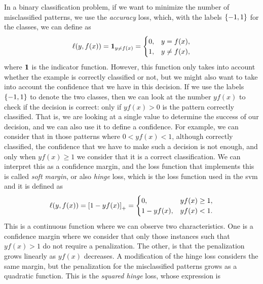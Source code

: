 In a binary classification problem, if we want to minimize the number of misclassified patterns, we use the \emph{accuracy} loss, which, with the labels $\left\{-1, 1\right\}$ for the classes, we can define as
\begin{equation}
    \label{eq:acc_def}
    \lossf(y, f(x)) = \ind_{y \neq f(x)} = 
    \begin{cases}
        0, & y = f(x) ,\\
        1, & y \neq f(x) ,
    \end{cases}
\end{equation}
where $\bm{1}$ is the indicator function.
% 
However, this function only takes into account whether the example is correctly classified or not, but we might also want to take into account the confidence that we have in this decision. If we use the labels $\left\{-1, 1\right\}$ to denote the two classes, then we can look at the number $y f(x)$ to check if the decision is correct: only if $y f(x) > 0$ is the pattern correctly classified. That is, we are looking at a single value to determine the success of our decision, and we can also use it to define a confidence. For example, we can consider that in those patterns where $0 < y f(x) < 1$, although correctly classified, the confidence that we have to make such a decision is not enough, and only when $y f(x) \geq 1$ we consider that it is a correct classification. We can interpret this as a confidence margin, and the loss function that implements this is called \emph{soft margin}, or also \emph{hinge} loss, which is the loss function used in the \acrshort{svm} and it is defined as
\begin{equation}
    \label{eq:hinge_def}
    \lossf(y, f(x)) = \pospart{1 - yf(x)} = 
    \begin{cases}
        0, & y f(x) \geq 1 ,\\
        1 - y f(x), & y f(x) < 1 .
    \end{cases}
\end{equation}
This is a continuous function where we can observe two characteristics. One is a confidence margin where we consider that only those instances such that $y f(x) > 1$ do not require a penalization. The other, is that the penalization grows linearly as $y f(x)$ decreases.
%
A modification of the hinge loss considers the same margin, but the penalization for the misclassified patterns grows as a quadratic function. This is the \emph{squared hinge} loss, whose expression is
